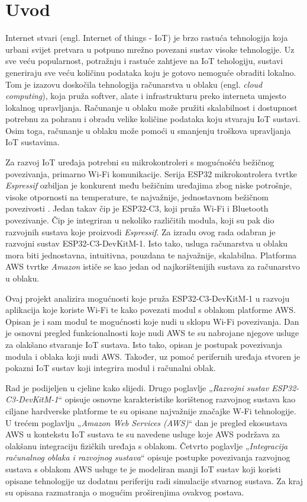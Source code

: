 \chapter{Uvod}

Internet stvari (engl. Internet of things - IoT) je brzo rastuća tehnologija koja urbani svijet pretvara u potpuno mrežno povezani sustav visoke tehnologije. Uz sve veću popularnost, potražnju i rastuće zahtjeve na IoT tehologiju, sustavi generiraju sve veću količinu podataka koju je gotovo nemoguće obraditi lokalno. Tom je izazovu doskočila tehnologija računarstva u oblaku (engl. \textit{cloud computing}), koja pruža softver, alate i infrastrukturu preko interneta umjesto lokalnog upravljanja. Računanje u oblaku može pružiti skalabilnost i dostupnost potrebnu za pohranu i obradu velike količine podataka koju stvaraju IoT sustavi. Osim toga, računanje u oblaku može pomoći u smanjenju troškova upravljanja IoT sustavima. 

Za razvoj IoT uređaja potrebni su mikrokontroleri s mogućnošću bežičnog povezivanja, primarno Wi-Fi komunikacije. Serija ESP32 mikrokontrolera tvrtke \textit{Espressif} ozbiljan je konkurent među bežičnim uređajima zbog niske potrošnje, visoke otpornosti na temperature, te najvažnije, jednostavnom bežičnom povezivosti \cite{top_25_iot}. Jedan takav čip je ESP32-C3, koji pruža Wi-Fi i Bluetooth povezivanje. Čip je integriran u nekoliko različitih modula, koji su pak dio razvojnih sustava koje proizvodi \textit{Espressif}. Za izradu ovog rada odabran je razvojni sustav ESP32-C3-DevKitM-1. Isto tako, usluga računarstva u oblaku mora biti jednostavna, intuitivna, pouzdana te najvažnije, skalabilna. Platforma AWS tvrtke \textit{Amazon} ističe se kao jedan od najkorištenijih sustava za računarstvo u oblaku.

Ovaj projekt analizira mogućnosti koje pruža ESP32-C3-DevKitM-1 u razvoju aplikacija koje koriste Wi-Fi te kako povezati modul s oblakom platforme AWS. Opisan je i sam modul te mogućnosti koje nudi u sklopu Wi-Fi povezivanja. Dan je osnovni pregled funkcionalnosti koje nudi AWS te su nabrojane njegove usluge za olakšano stvaranje IoT sustava. Isto tako, opisan je postupak povezivanja modula i oblaka koji nudi AWS. Također, uz pomoć perifernih uređaja stvoren je pokazni IoT sustav koji integrira modul i računalni oblak.

Rad je podijeljen u cjeline kako slijedi. Drugo poglavlje „\textit{Razvojni sustav ESP32- C3-DevKitM-1}“ opisuje osnovne karakteristike korištenog razvojnog sustava kao ciljane hardverske platforme te su opisane najvažnije značajke W-Fi tehnologije. U trećem poglavlju „\textit{Amazon Web Services (AWS)}“ dan je pregled ekosustava AWS u kontekstu IoT sustava te su navedene usluge koje AWS podržava za olakšanu integraciju fizičkih uređaja s oblakom. Četvrto poglavlje „\textit{Integracija računalnog oblaka i razvojnog sustava}“ opisuje postupke povezivanja razvojnog sustava s oblakom AWS usluge te je modeliran manji IoT sustav koji koristi opisane tehnologije uz dodatnu periferiju radi simulacije stvarnog sustava. Za kraj su opisana razmatranja o mogućim proširenjima ovakvog postava. 

\eject
